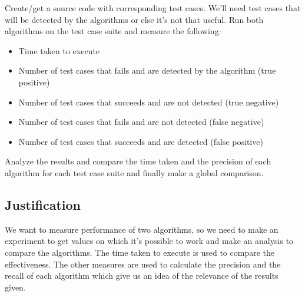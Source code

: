 \documentclass{article}
\begin{document}
Create/get a source code with corresponding test cases. We’ll need test cases that will be detected by the algorithms or else it’s not that useful. Run both algorithms on the test case suite and measure the following:
\begin{itemize}
    \item Time taken to execute
    \item Number of test cases that fails and are detected by the algorithm (true positive)
    \item Number of test cases that succeeds and are not detected (true negative)
    \item Number of test cases that fails and are not detected (false negative)
    \item Number of test cases that succeeds and are detected (false positive)
\end{itemize}
Analyze the results and compare the time taken and the precision of each algorithm for each test case suite and finally make a global comparison.

\subsection{Justification}
We want to measure performance of two algorithms, so we need to make an experiment to get values on which it’s possible to work and make an analysis to compare the algorithms.
The time taken to execute is used to compare the effectiveness.
The other measures are used to calculate the precision and the recall of each algorithm which give us an idea of the relevance of the results given.
\end{document}
